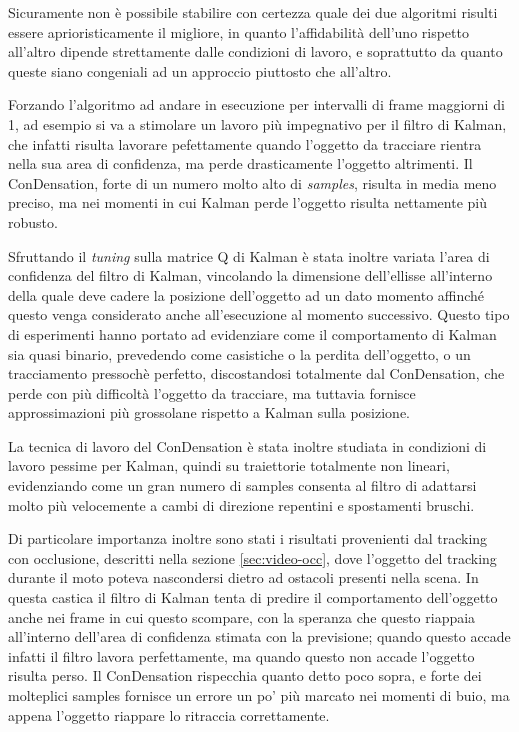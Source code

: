 Sicuramente non è possibile stabilire con certezza quale dei due algoritmi risulti essere aprioristicamente il migliore, in quanto l'affidabilità dell'uno rispetto all'altro dipende strettamente dalle condizioni di lavoro, e soprattutto da quanto queste siano congeniali ad un approccio piuttosto che all'altro.

Forzando l'algoritmo ad andare in esecuzione per intervalli di frame maggiorni di 1, ad esempio si va a stimolare un lavoro più impegnativo per il filtro di Kalman, che infatti risulta lavorare pefettamente quando l'oggetto da tracciare rientra nella sua area di confidenza, ma perde drasticamente l'oggetto altrimenti. Il ConDensation, forte di un numero molto alto di \textit{samples}, risulta in media meno preciso, ma nei momenti in cui Kalman perde l'oggetto risulta nettamente più robusto.

Sfruttando il \textit{tuning} sulla matrice Q di Kalman è stata inoltre variata l'area di confidenza del filtro di Kalman, vincolando la dimensione dell'ellisse all'interno della quale deve cadere la posizione dell'oggetto ad un dato momento affinché questo venga considerato anche all'esecuzione al momento successivo. Questo tipo di esperimenti hanno portato ad evidenziare come il comportamento di Kalman sia quasi binario, prevedendo come casistiche o la perdita dell'oggetto, o un tracciamento pressochè perfetto, discostandosi totalmente dal ConDensation, che perde con più difficoltà l'oggetto da tracciare, ma tuttavia fornisce approssimazioni più grossolane rispetto a Kalman sulla posizione.

La tecnica di lavoro del ConDensation è stata inoltre studiata in condizioni di lavoro pessime per Kalman, quindi su traiettorie totalmente non lineari, evidenziando come un gran numero di samples consenta al filtro di adattarsi molto più velocemente a cambi di direzione repentini e spostamenti bruschi.

Di particolare importanza inoltre sono stati i risultati provenienti dal tracking con occlusione, descritti nella sezione \ref{sec:video-occ}, dove l'oggetto del tracking durante il moto poteva nascondersi dietro ad ostacoli presenti nella scena. In questa castica il filtro di Kalman tenta di predire il comportamento dell'oggetto anche nei frame in cui questo scompare, con la speranza che questo riappaia all'interno dell'area di confidenza stimata con la previsione; quando questo accade infatti il filtro lavora perfettamente, ma quando questo non accade l'oggetto risulta perso. Il ConDensation rispecchia quanto detto poco sopra, e forte dei molteplici samples fornisce un errore un po' più marcato nei momenti di buio, ma appena l'oggetto riappare lo ritraccia correttamente.

